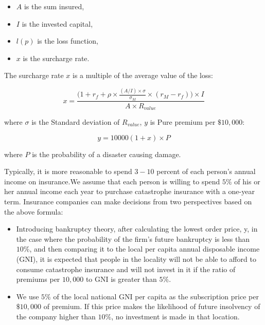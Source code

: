 \documentclass{mcmthesis}
\begin{document}
\begin{itemize}
\item $A$ is the sum insured,
\item $I$ is the invested capital,
\item $l(p)$ is the loss function,
\item $x$ is the surcharge rate.
\end{itemize}

The surcharge rate $x$ is a multiple of the average value of the loss:

\begin{equation}
x = \frac{\Big(1+r_f+\rho \times \frac{(A/I) \times \sigma}{\sigma_M} \times 
(r_M-r_f) \Big) \times I}{A \times R_{value}} \label{eq14}
\end{equation}

where $\sigma$ is the Standard deviation of $R_{value}$, $y$ is Pure premium per $\$10,000$:

\begin{equation}
y = 10000(1+x) \times P
\end{equation}

\noindent where $P$ is the probability of a disaster causing damage.

Typically, it is more reasonable to spend $3-10$ percent of each person's annual income on
insurance.We assume that each person is willing to spend $5\%$ of his or her annual income each
year to purchase catastrophe insurance with a one-year term. Insurance companies can make
decisions from two perspectives based on the above formula:

\begin{itemize}
\item Introducing bankruptcy theory, after calculating the lowest order price, y, in the case
where the probability of the firm's future bankruptcy is less than $10\%$, and then comparing
it to the local per capita annual disposable income (GNI), it is expected that
people in the locality will not be able to afford to consume catastrophe insurance and
will not invest in it if the ratio of premiums per $10,000$ to GNI is greater than $5\%$.

\item We use $5\%$ of the local national GNI per capita as the subscription price per $\$10,000$
of premium. If this price makes the likelihood of future insolvency of the company
higher than $10\%$, no investment is made in that location.
\end{itemize}
\end{document}
